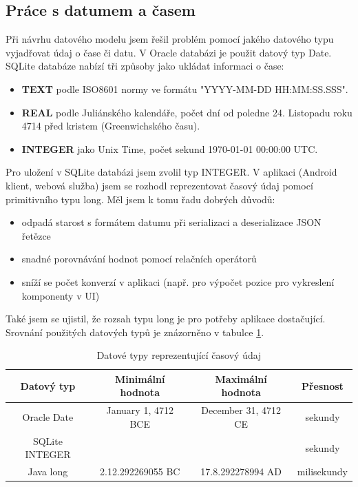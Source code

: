 \documentclass{bakalarka}
\begin{document}
\subsection{Práce s datumem a časem}
Při návrhu datového modelu jsem řešil problém pomocí jakého datového typu vyjadřovat údaj o čase či datu. V Oracle databázi je použit datový typ Date. SQLite databáze nabízí tři způsoby jako ukládat informaci o čase:
\begin{itemize}
\item \textbf{TEXT} podle ISO8601 normy ve formátu "YYYY-MM-DD HH:MM:SS.SSS".
\item \textbf{REAL} podle Juliánského kalendáře, počet dní od poledne 24. Listopadu roku 4714 před kristem (Greenwichského času).
\item \textbf{INTEGER} jako Unix Time, počet sekund 1970-01-01 00:00:00 UTC.
\end{itemize}

\noindent
Pro uložení v SQLite databázi jsem zvolil typ INTEGER. V aplikaci (Android klient, webová služba) jsem se rozhodl reprezentovat časový údaj pomocí primitivního typu long. Měl jsem k tomu řadu dobrých důvodů:
\begin{itemize}
\item odpadá starost s formátem datumu při serializaci a deserializace JSON řetězce
\item snadné porovnávání hodnot pomocí relačních operátorů
\item sníží se počet konverzí v aplikaci (např. pro výpočet pozice pro vykreslení komponenty v UI)
\end{itemize}

Také jsem se ujistil, že rozsah typu long je pro potřeby aplikace dostačující. Srovnání použitých datových typů je znázorněno v tabulce \ref{tab:cas}. 

\begin{table}[H]
\centering
\begin{tabular}{| c | c | c | c |}
\hline
Datový typ &  Minimální hodnota & Maximální hodnota & Přesnost \\ \hline
Oracle Date &   January 1, 4712 BCE  &  December 31, 4712 CE &  sekundy \\ \hline
SQLite INTEGER &    &  &  sekundy \\ \hline
Java long & 2.12.292269055 BC   & 17.8.292278994 AD &  milisekundy \\ \hline
\end{tabular}
\caption{Datové typy reprezentující časový údaj}
\label{tab:cas}
\end{table}
\end{document}
